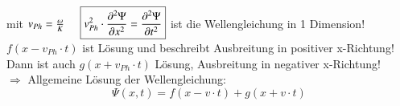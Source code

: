 mit $ v_{Ph} = \frac{\omega}{K} \hspace{5mm} \boxed{v^2_{Ph} \cdot \frac{\partial^2\Psi}{\partial x^2} = \frac{\partial^2\Psi}{\partial t^2}} $ ist die Wellengleichung in 1 Dimension! \\

$ f (x-v_{Ph} \cdot t) $ ist Lösung und beschreibt Ausbreitung in positiver x-Richtung!\\
Dann ist auch $ g(x+v_{Ph} \cdot t) $ Lösung, Ausbreitung in negativer x-Richtung!\\
\break
$ \Rightarrow $ Allgemeine Lösung der Wellengleichung:
$$ \Psi(x,t) = f(x-v\cdot t) + g(x+v\cdot t) $$
\bild